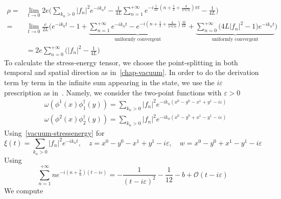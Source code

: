 \begin{equation*}
\begin{split}
\rho =& \lim_{t\rightarrow 0} 2e \bigg(\sum_{k_n>0} |f_n|^2 e^{-ik_nt} 
- \frac{ 1}{ 4L}\sum_{n=1}^{+\infty} e^{-i\frac{1}{2L}(n+\frac 1 2 + \frac{4}{\pi^2 C n}) \pi t} - \frac{1}{4L} \bigg) \\
%
= & \lim_{t\rightarrow 0 }\frac{e}{2L}\Big( e^{-ik_0t} - 1 +
\underbrace{ \sum_{n=1}^{+\infty}e^{-ik_nt} - e^{-i(n+\frac 1 2 + \frac{4}{\pi^2 C n} )\frac{\pi t}{2L}} }_{\textrm{uniformly convergent}} 
+\underbrace{\sum_{n=0}^{+\infty}\big(4 L  |f_n|^2 -1 \big) e^{-ik_nt}}_{\textrm{uniformly convergent}}
\Big) \\
& = 2e \sum_{n=0}^{+\infty}\big(|f_n|^2 -\frac{1}{4L} \big)
\end{split}
\end{equation*}
%
To calculate the stress-energy tensor, we choose the point-splitting in both temporal and spatial direction as in~\cref{chap-vacuum}. 
In order to do the derivation term by term in the infinite sum appearing in the state, we use the $i\varepsilon$ prescription as in~\cite{Zahn2017}. 
Namely, we consider the two-point functions with $\varepsilon >0$
\begin{equation*}
\begin{split}
& \omega(\phi^1(x)\phi_1^\dagger(y)) = 
 \sum_{k_n>0} |f_n|^2 e^{-ik_n(x^0 - y^0 - x^1 + y^1-i\varepsilon)} \\
& \omega(\phi^2(x)\phi_2^\dagger(y)) =
\sum_{k_n>0} |f_n|^2 e^{-ik_n(x^0 - y^0 + x^1 - y^1-i\varepsilon)}
\end{split}
\end{equation*}
%
Using~\cref{vacuum-stressenergy} for 
\begin{equation*}
\xi(t) = \sum_{k_n>0} |f_n|^2 e^{-ik_n t} ,  \quad
z = x^0 - y^0 - x^1 + y^1-i\varepsilon  ,\quad
w = x^0 - y^0 + x^1 - y^1-i\varepsilon
\end{equation*}
Using
\begin{equation*}
\sum_{n=1}^{+\infty} n e^{-i(n+\frac b n )(t - i\varepsilon)}
= -\frac{1}{(t-i\varepsilon)^2} - \frac{1}{12}-b + \mathcal{O}(t-i\varepsilon)
\end{equation*}
We compute
